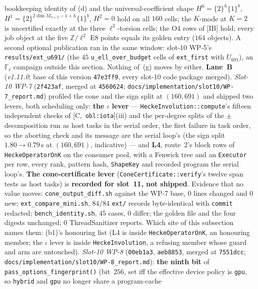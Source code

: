 \documentclass[11pt]{article}
\theoremstyle{remark}
\newcommand{\F}{\mathbb{F}}
\newcommand{\Z}{\mathbb{Z}}
\newcommand{\Fl}{\F_\ell}
\newcommand{\HA}[1]{[C,~\texttt{#1}]}      %
\begin{document}
bookkeeping identity of (d) and the universal-coefficient shape $H^0=\{2\}^{h}\{1\}^{b}$,
$H^1=\{2\}^{2\dim M_{n+2}-1+h}\{1\}^{b}$, $H^2=0$ hold on all $160$ cells; the $K$-mode at $K=2$ is
uncertified exactly at the three $\ell^2$-torsion cells; the O4 rows of [IB] hold; every job object
at the five $\Z/\ell^2$ E8 points equals its golden entry ($164$ objects). A second optional
publication ran in the same window: slot-10 WP-5's \texttt{results/ext\_u691/} (the $45$
\texttt{u\_ell\_over\_budget} cells of \texttt{ext\_first} with $U_{691}$), an $\Fl$ campaign outside
this section. Nothing of~(g) moves by either.
\textbf{Lane~B} (\emph{v1.11.0}; base of this version \texttt{47e3ff9}, every slot-10 code
package merged). \emph{Slot-10 WP-7} (\texttt{2f423af}, merged at \texttt{4560624};
\texttt{docs/implementation/slot10/WP-7\_report.md}) profiled the cone and the sign split at
$(160,691)$ and shipped two levers, both scheduling only: \textbf{the $\iota$ lever} ---
\texttt{HeckeInvolution::compute}'s fifteen independent checks of \HA{obl:iota}(iii) and the
per-degree splits of the $\pm$ decomposition run as host tasks in the serial order, the first failure
in task order, so the aborting check and its message are the serial loop's (the sign split
$1.80\to0.79$\,s at $(160,691)$, indicative) --- and \textbf{L4}, route~2's block rows of
\texttt{HeckeOperatorOnK} on the consumer pool, with a Fenwick tree and an \texttt{Executor} per row,
every rank, pattern hash, \texttt{ShapeKey} and recorded program the serial loop's. \textbf{The
cone-certificate lever} (\texttt{ConeCertificate::verify}'s twelve span tests as host tasks) is
\textbf{recorded for slot~11, not shipped}. Evidence that no value moves: \texttt{cone\_output\_diff.sh}
against the WP-7 base, $0$ lines changed and $0$ new; \texttt{ext\_compare\_mini.sh}, $84/84$
\texttt{ext/} records byte-identical with \texttt{commit} redacted; \texttt{bench\_identity.sh}, $45$
cases, $0$ differ; the golden file and the four digests unchanged; $0$ ThreadSanitizer reports.
Which site of this subsection names them: (b1)'s honouring list (L4 is inside
\texttt{HeckeOperatorOnK}, an honouring member; the $\iota$ lever is inside \texttt{HeckeInvolution},
a refusing member whose guard and arm are untouched). \emph{Slot-10 WP-8} (\texttt{00eb1a3},
\texttt{aeb8853}, merged at \texttt{7551dcc}; \texttt{docs/implementation/slot10/WP-8\_report.md}):
\textbf{the ninth bit} of \texttt{pass\_options\_fingerprint()} (bit~$256$, set iff the effective
device policy is \texttt{gpu}, so \texttt{hybrid} and \texttt{gpu} no longer share a program-cache
\end{document}

